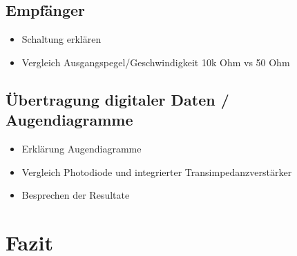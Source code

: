 \documentclass[12pt,a4paper]{article}
\begin{document}
\subsection{Empfänger}
\begin{itemize}
\item Schaltung erklären
\item Vergleich Ausgangspegel/Geschwindigkeit 10k Ohm vs 50 Ohm
\end{itemize}

\subsection{Übertragung digitaler Daten / Augendiagramme}
\begin{itemize}
\item Erklärung Augendiagramme
\item Vergleich Photodiode und integrierter Transimpedanzverstärker
\item Besprechen der Resultate
\end{itemize}

\section{Fazit}
\end{document}
